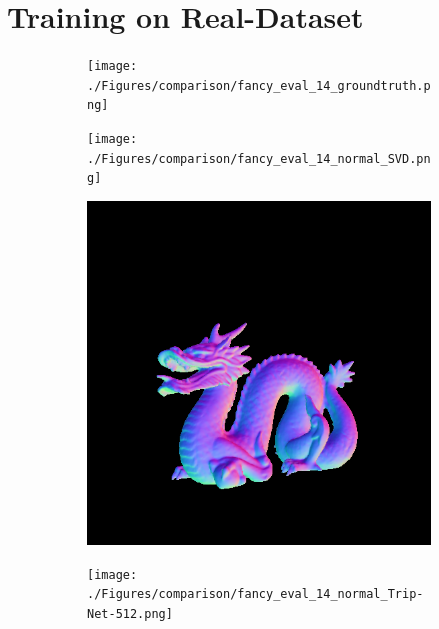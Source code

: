 \documentclass[border=15pt, multi, tikz]{article}
\begin{document}
\section{Training on Real-Dataset}


\begin{figure}[H]
	\centering
	\begin{subfigure}[b]{0.24\linewidth}
		\texttt{[image: ./Figures/comparison/fancy\_eval\_14\_groundtruth.png]}
	\end{subfigure}
	\begin{subfigure}[b]{0.24\linewidth}
		\texttt{[image: ./Figures/comparison/fancy\_eval\_14\_normal\_SVD.png]}
	\end{subfigure}
	\begin{subfigure}[b]{0.24\linewidth}
		\includegraphics[width=\linewidth]{./Figures/comparison/fancy_eval_14_normal_GCNN-512-269.png}
	\end{subfigure}
	\begin{subfigure}[b]{0.24\linewidth}
		\texttt{[image: ./Figures/comparison/fancy\_eval\_14\_normal\_Trip-Net-512.png]}
	\end{subfigure}
	

\end{figure}
\end{document}
